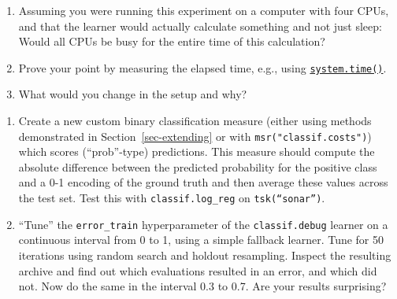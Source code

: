 \begin{enumerate}
\def\labelenumi{(\alph{enumi})}
\tightlist
\item
  Assuming you were running this experiment on a computer with four
  CPUs, and that the learner would actually calculate something and not
  just sleep: Would all CPUs be busy for the entire time of this
  calculation?
\item
  Prove your point by measuring the elapsed time, e.g., using
  \href{https://www.rdocumentation.org/packages/base/topics/system.time}{\texttt{system.time()}}.
\item
  What would you change in the setup and why?
\end{enumerate}

\begin{enumerate}
\def\labelenumi{\arabic{enumi}.}
\setcounter{enumi}{1}
\item
  Create a new custom binary classification measure (either using
  methods demonstrated in Section~\ref{sec-extending} or with
  \texttt{msr("classif.costs")}) which scores (``prob''-type)
  predictions. This measure should compute the absolute difference
  between the predicted probability for the positive class and a 0-1
  encoding of the ground truth and then average these values across the
  test set. Test this with \texttt{classif.log\_reg} on
  \texttt{tsk(“sonar”)}.
\item
  ``Tune'' the \texttt{error\_train} hyperparameter of the
  \texttt{classif.debug} learner on a continuous interval from 0 to 1,
  using a simple fallback learner. Tune for 50 iterations using random
  search and holdout resampling. Inspect the resulting archive and find
  out which evaluations resulted in an error, and which did not. Now do
  the same in the interval 0.3 to 0.7. Are your results surprising?
\end{enumerate}
